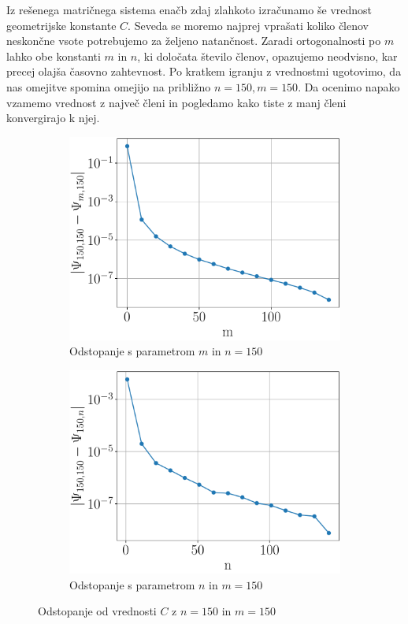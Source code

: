\documentclass{article}
\begin{document}
Iz rešenega matričnega sistema enačb zdaj zlahkoto izračunamo še vrednost geometrijske konstante $C$. Seveda se moremo najprej vprašati koliko členov neskončne vsote potrebujemo za željeno natančnost. Zaradi ortogonalnosti po $m$ lahko obe konstanti $m$ in $n$, ki določata število členov, opazujemo neodvisno, kar precej olajša časovno zahtevnost. Po kratkem igranju z vrednostmi ugotovimo, da nas omejitve spomina omejijo na približno $n=150, m=150$. Da ocenimo napako vzamemo vrednost z največ členi in pogledamo kako tiste z manj členi konvergirajo k njej.
\newpage
\begin{figure}[H]
    \centering
    \begin{subfigure}[b]{0.49\textwidth}
        \centering
        \includegraphics[width=\linewidth]{mprecision.pdf}
		\caption{Odstopanje s parametrom $m$ in $n=150$}
    \end{subfigure}
    \hfill
    \begin{subfigure}[b]{0.49\textwidth}
        \centering
        \includegraphics[width=\linewidth]{nprecision.pdf}
		\caption{Odstopanje s parametrom $n$ in $m=150$}
    \end{subfigure}
	\caption{Odstopanje od vrednosti $C$ z $n=150$ in $m=150$}
\end{figure}
\end{document}
